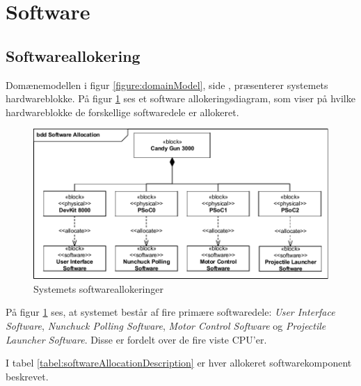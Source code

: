\section{Software}

\subsection{Softwareallokering}
\label{afsnit:SoftwareAllokering}

Domænemodellen i figur \ref{figure:domainModel}, side \pageref{figure:domainModel}, præsenterer systemets hardwareblokke. På figur \ref{figure:allocationDiagram} ses et software allokeringsdiagram, som viser på hvilke hardwareblokke de forskellige softwaredele er allokeret. 

\begin{figure}[H]
	\centering
	\includegraphics[width=\textwidth]{SystemArkitektur/images/SoftwareAllocation}
	\caption{Systemets softwareallokeringer}
	\label{figure:allocationDiagram}
\end{figure}

\noindent På figur \ref{figure:allocationDiagram} ses, at systemet består af fire primære softwaredele: \textit{User Interface Software}, \textit{Nunchuck Polling Software}, \textit{Motor Control Software} og \textit{Projectile Launcher Software}. Disse er fordelt over de fire viste CPU'er.\newline

\noindent I tabel \ref{tabel:softwareAllocationDescription} er hver allokeret softwarekomponent beskrevet.


